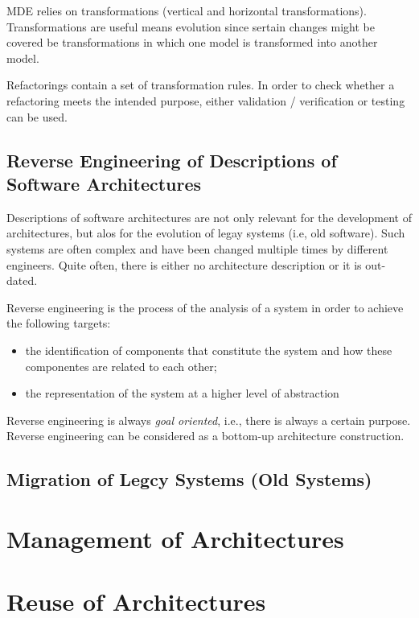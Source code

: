 MDE relies on transformations (vertical and horizontal transformations).
Transformations are useful means evolution since sertain changes might be covered be 
transformations in which one model is transformed into another model.

Refactorings contain a set of transformation rules.
In order to check whether a refactoring meets the intended purpose,
either validation / verification or testing can be used.

\subsection{Reverse Engineering of Descriptions of Software Architectures}

Descriptions of software architectures are not only relevant for the development
of architectures, but alos for the evolution of legay systems (i.e, old software).
Such systems are often complex and have been changed multiple times
by different engineers. Quite often, there is either no architecture description or
it is out-dated. 

\begin{definition}
Reverse engineering is the process of the analysis of a system in order
to achieve the following targets:
 \begin{itemize}
	 \item the identification of components that constitute the system
	       and how these componentes are related to each other;
	 \item the representation of the system at a higher level of abstraction
 \end{itemize}
\end{definition}

Reverse engineering is always \emph{goal oriented}, i.e., there is always a
certain purpose.
Reverse engineering can be considered as a bottom-up architecture construction.


\subsection{Migration of Legcy Systems (Old Systems)}




\section{Management of Architectures}




\section{Reuse of Architectures}

